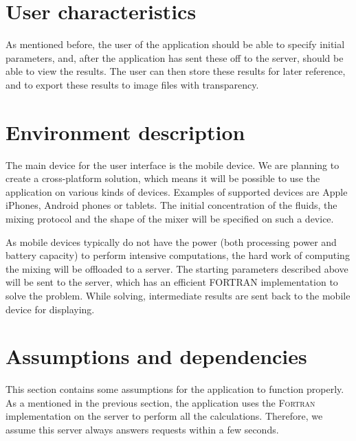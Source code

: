 \section{User characteristics}
As mentioned before, the user of the application should be able to specify initial parameters, and, after the application has sent these off to the server, should be able to view the results. The user can then store these results for later reference, and to export these results to image files with transparency.

\section{Environment description}
The main device for the user interface is the mobile device. We are planning to create a cross-platform solution, which means it will be possible to use the application on various kinds of devices. Examples of supported devices are Apple iPhones, Android phones or tablets. The initial concentration of the fluids, the mixing protocol and the shape of the mixer will be specified on such a device.

As mobile devices typically do not have the power (both processing power and battery capacity) to perform intensive computations, the hard work of computing the mixing will be offloaded to a server. The starting parameters described above will be sent to the server, which has an efficient FORTRAN implementation to solve the problem. While solving, intermediate results are sent back to the mobile device for displaying.

\section{Assumptions and dependencies}
This section contains some assumptions for the application to function properly.\\
As a mentioned in the previous section, the application uses the \textsc{Fortran} implementation on the server to perform all the calculations. Therefore, we assume this server always answers requests within a few seconds.
